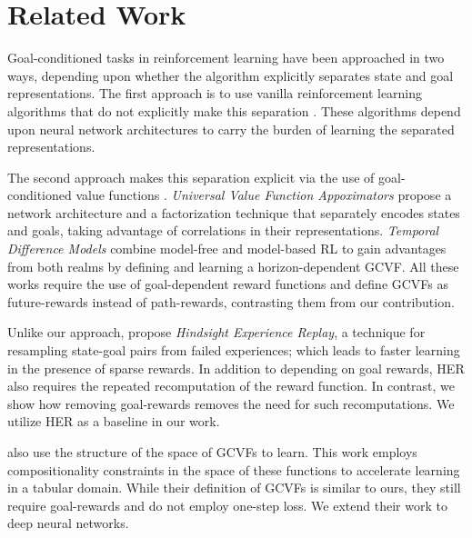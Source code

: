 \section{Related Work}

Goal-conditioned tasks in reinforcement learning have been approached in two
ways, depending upon whether the algorithm explicitly separates state and goal
representations.
The first approach is to use vanilla reinforcement
learning algorithms that do not explicitly make this separation
\citep{mirowski2016learning,dosovitskiy2016learning,gupta2017cognitive,parisotto2017neural,mirowski2018learning}.
These algorithms depend upon neural network architectures to
carry the burden of learning the separated representations.

The second approach makes this separation explicit via the use of goal-conditioned value
functions \citep{foster2002structure,sutton2011horde}. \emph{Universal
Value Function Appoximators} \citep{schaul2015universal} propose a
network architecture and a factorization technique that separately
encodes states and goals, taking advantage of correlations in their representations.
\emph{Temporal Difference Models} combine model-free
and model-based RL to gain advantages from both realms by defining and learning
a horizon-dependent GCVF. All these works require the use of
goal-dependent reward functions and define GCVFs as future-rewards instead of
path-rewards, contrasting them from our contribution. 

Unlike our approach, \citet{andrychowicz2017hindsight} propose \emph{Hindsight Experience Replay},
a technique for resampling state-goal pairs from failed experiences; which leads
to faster learning in the presence of sparse rewards. In addition to depending
on goal rewards, HER also requires the repeated recomputation of the reward
function. In contrast, we show how removing goal-rewards removes the need for
such recomputations. We utilize HER as a baseline in our work.

\citet{dhiman2018floydwarshall} also use the structure of the space of GCVFs to
learn.
This work employs compositionality constraints
in the space of these functions to accelerate learning in a tabular domain. While
their definition of GCVFs is similar to ours, they still require
goal-rewards and do not employ one-step loss. We extend their
work to deep neural networks.


